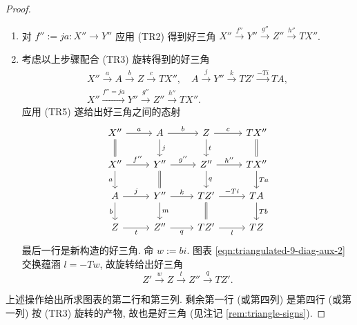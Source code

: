 \begin{proof}
\begin{enumerate}
		\item 对 $f'' := ja: X'' \to Y''$ 应用 (TR2) 得到好三角 $X'' \xrightarrow{f''} Y'' \xrightarrow{g''} Z'' \xrightarrow{h''} TX''$.
		\item 考虑以上步骤配合 (TR3) 旋转得到的好三角
		\begin{gather*}
			X'' \xrightarrow{a} A \xrightarrow{b} Z \xrightarrow{c} TX'', \quad A \xrightarrow{j} Y'' \xrightarrow{k} TZ' \xrightarrow{-Ti} TA, \\
			X'' \xrightarrow{f'' = ja} Y'' \xrightarrow{g''} Z'' \xrightarrow{h''} TX'' .
		\end{gather*}
		应用 (TR5) 遂给出好三角之间的态射
		\begin{equation}\label{eqn:triangulated-9-diag-aux-2}\begin{tikzcd}
			X'' \arrow[r, "a"] \arrow[equal, d] & A \arrow[r, "b"] \arrow[d, "j"] & Z \arrow[r, "c"] \arrow[d, "t"] & TX'' \arrow[equal, d] \\
			X'' \arrow[r, "{f''}"] \arrow[d, "a"'] & Y'' \arrow[r, "{g''}"] \arrow[equal, d] & Z'' \arrow[r, "{h''}"] \arrow[d, "q"] & TX'' \arrow[d, "Ta"] \\
			A \arrow[r, "j"] \arrow[d, "b"'] & Y'' \arrow[r, "k"] \arrow[d, "m"] & TZ' \arrow[r, "{-Ti}"] \arrow[equal, d] & TA \arrow[d, "Tb"] \\
			Z \arrow[r, "t"'] & Z'' \arrow[r, "q"'] & TZ' \arrow[r, "l"'] & TZ
		\end{tikzcd}\end{equation}
		最后一行是新构造的好三角. 命 $w := bi$. 图表 \eqref{eqn:triangulated-9-diag-aux-2} 交换蕴涵 $l = -Tw$, 故旋转给出好三角
		\[ Z' \xrightarrow{w} Z \xrightarrow{t} Z'' \xrightarrow{q} TZ' . \]
	\end{enumerate}

	上述操作给出所求图表的第二行和第三列. 剩余第一行 (或第四列) 是第四行 (或第一列) 按 (TR3) 旋转的产物, 故也是好三角 (见注记 \ref{rem:triangle-signs}).
	

\end{proof}
